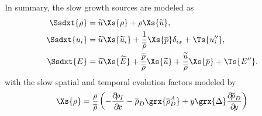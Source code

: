 {%
In summary, the slow growth sources are modeled as
%
\begin{subequations}
\begin{align}
\label{eqn:slowGrowthFinal}
\Ssdxt{\rho}
     &= \fav{u} \Xs{\rho} + \rho \Xs{\fav{u}}
, \\
\Ssdxt{u_i}
 &=
   \fav{u} \Xs{\fav{u}_i} + \frac{1}{\mean{\rho}} \Xs{\mean{p}} \delta_{ix}
   + \Ts{\ffluc{u}_i}
, \\
\Ssdxt{E}
 &=
     \fav{u} \Xs{\fav{E}}
   + \frac{\mean{p}}{\mean{\rho}} \Xs{\fav{u} }
   + \frac{\fav{u} }{\mean{\rho}} \Xs{\mean{p}}
   + \Ts{\ffluc{E}}
.
\end{align}
\end{subequations}
%
with the slow spatial and temporal evolution factors modeled by
%
\begin{subequations}
\begin{align}
\Xs{\rho} &=
    \frac{\rho}{\mean{\rho}} \left(
        - \pp{\rho_I}{x}
        - \mean{\rho}_D \grx{\mean{\rho}_D^A}
        + y \grx{\Delta} \pp{\mean{\rho}_D}{y}
    \right)
\\

\end{align}
\end{subequations}}
